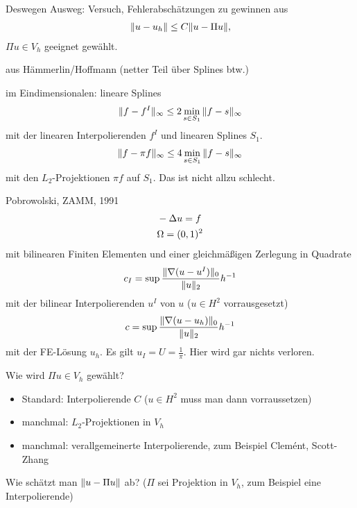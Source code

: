 Deswegen Ausweg: Versuch, Fehlerabschätzungen zu gewinnen aus 
\begin{align*}
  \|u-u_h\| \leq C \|u - \Pi u\|,
\end{align*}
$\Pi u \in V_h$ geeignet gewählt.
\begin{beispiel} aus Hämmerlin/Hoffmann (netter Teil über Splines btw.)

im Eindimensionalen: lineare Splines
\begin{align*}
  \|f - f^I\|_\infty \leq 2 \min_{s \in S_1}\|f- s\|_\infty
\end{align*}
mit der linearen Interpolierenden $f^I$ und linearen Splines $S_1$.  
\begin{align*}
  \|f - \pi f\|_\infty \leq 4 \min_{s \in S_1}\|f - s\|_\infty
\end{align*}
mit den $L_2$-Projektionen $\pi f$ auf $S_1$.
Das ist nicht allzu schlecht. 
\end{beispiel}
\begin{beispiel} Pobrowolski, ZAMM, 1991
  \begin{align*}
    &- \Delta u = f\\
    & \Omega = (0,1)^2
  \end{align*}
mit bilinearen Finiten Elementen und einer gleichmäßigen Zerlegung in Quadrate
\begin{align*}
  c_I = \sup \frac{\|\nabla (u- u^I)\|_0}{\|u\|_2} h^{-1}
\end{align*}
mit der bilinear Interpolierenden $u^I$ von $u$ ($u \in H^2$ vorrausgesetzt)
\begin{align*}
  c = \sup \frac{\|\nabla (u- u_h)\|_0}{\|u\|_2} h^{-1}
\end{align*}
mit der FE-Lösung $u_h$. Es gilt $u_I = U = \frac 1 \pi$. 
Hier wird gar nichts verloren. 
\end{beispiel}
Wie wird $\Pi u \in V_h$ gewählt? 
\begin{itemize}
\item Standard: Interpolierende $C$ ($u \in H^2$ muss man dann vorraussetzen)
\item manchmal: $L_2$-Projektionen in $V_h$
\item manchmal: verallgemeinerte Interpolierende, zum Beispiel Clemént, Scott-Zhang
\end{itemize}
Wie schätzt man $\|u- \Pi u\|$ ab? ($\Pi$ sei Projektion in $V_h$, zum Beispiel eine Interpolierende)

